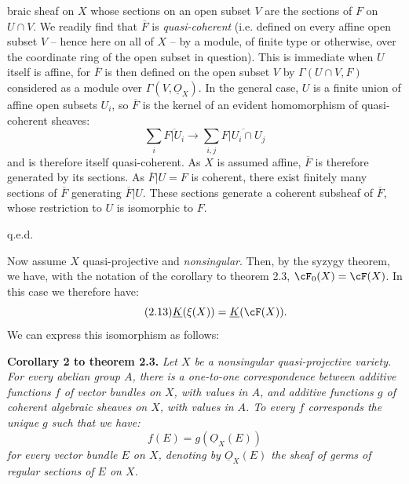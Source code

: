 %
braic sheaf on $X$ whose sections on an open subset $V$ are the sections of $F$ on $U\cap V$. We readily find that $\overline F$ is \emph{quasi-coherent} (i.e. defined on every affine open subset $V$ -- hence here on all of $X$ -- by a module, of finite type or otherwise, over the coordinate ring of the open subset in question). This is immediate when $U$ itself is affine, for $\overline F$ is then defined on the open subset $V$ by $\Gamma(U\cap V,F)$ considered as a module over $\Gamma(V,\underline{O}_X)$. In the general case, $U$ is a finite union of affine open subsets $U_i$, so $\overline F$ is the kernel of an evident homomorphism of quasi-coherent sheaves:
\[
 \sum_i \overline{F|U_i}\longrightarrow \sum_{i,j}\overline{F|U_i\cap U_j}
\]
and is therefore itself quasi-coherent. As $X$ is assumed affine, $\overline F$ is therefore generated by its sections. As $\overline F|U=F$ is coherent, there exist finitely many sections of $\overline F$ generating $\overline F|U$. These sections generate a coherent subsheaf of $\overline F$, whose restriction to $U$ is isomorphic to $F$.
\begin{flushright}q.e.d.\end{flushright}

Now assume $X$ quasi-projective and \emph{nonsingular}. Then, by the syzygy theorem, we have, with the notation of the corollary to theorem 2.3, $\cF_0(X)=\cF(X)$. In this case we therefore have:
\begin{equation}\tag{2.13}
 \underline{K}(\xi(X))=\underline{K}(\cF(X)).
\end{equation}
We can express this isomorphism as follows:

\textbf{Corollary 2 to theorem 2.3.} \emph{Let $X$ be a nonsingular quasi-projective variety. For every abelian group $A$, there is a one-to-one correspondence between additive functions $f$ of vector bundles on $X$, with values in $A$, and additive functions $g$ of coherent algebraic sheaves on $X$, with values in $A$. To every $f$ corresponds the unique $g$ such that we have:}
%
\begin{equation}\tag{2.14}
 f(E)=g(\underline{O}_X(E))
\end{equation}
\emph{for every vector bundle $E$ on $X$, denoting by $\underline{O}_X(E)$ the sheaf of germs of regular sections of $E$ on $X$.}

